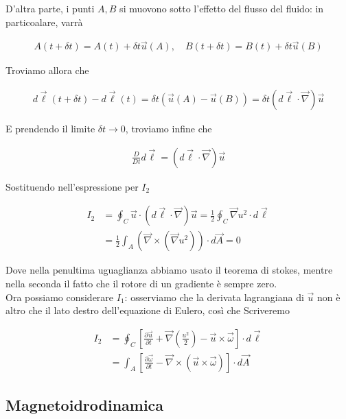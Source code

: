 \documentclass{report}
\begin{document}
D'altra parte, i punti \(A, B\) si muovono sotto l'effetto del flusso del fluido: in particoalare, varrà 

\begin{align}
    A (t+\delta t) = A(t) + \delta t\vec{u}(A), \quad B (t+\delta t) = B(t) + \delta t\vec{u}(B)
\end{align}

Troviamo allora che 

\begin{align}
    d\vec{\ell}(t + \delta t) - d\vec{\ell}(t) = \delta t(\vec{u}(A) - \vec{u}(B)) = \delta t (d\vec{\ell}\cdot \vec{\nabla})\vec{u}
\end{align}

E prendendo il limite \(\delta t \rightarrow 0\), troviamo infine che 

\begin{align}
    \frac{D}{Dt}d\vec{\ell} = (d\vec{\ell}\cdot \vec{\nabla})\vec{u}
\end{align}

Sostituendo nell'espressione per \(I_2\)

\begin{align}
    I_2 &= \oint_C \vec{u}\cdot (d\vec{\ell}\cdot \vec{\nabla})\vec{u} = \frac{1}{2}\oint_C \vec{\nabla}u^2 \cdot d\vec{\ell} \\
    &= \frac{1}{2}\int_A (\vec{\nabla}\times (\vec{\nabla} u^2))\cdot d\vec{A} = 0
\end{align}

Dove nella penultima uguaglianza abbiamo usato il teorema di stokes, mentre nella seconda il fatto che il rotore di un gradiente è sempre zero. \\

Ora possiamo considerare \(I_1\): osserviamo che la derivata lagrangiana di \(\vec{u}\) non è altro che il lato destro dell'equazione di Eulero, così che Scriveremo

\begin{align}
    I_2 &= \oint_C \left[\frac{\partial \vec{u}}{\partial t} + \vec{\nabla}\left(\frac{u^2}{2}\right) - \vec{u}\times \vec{\omega}\right]\cdot d\vec{\ell} \\
    &=  \int_A \left[\frac{\partial \vec{\omega}}{\partial t}- \vec{\nabla}\times (\vec{u}\times \vec{\omega})\right]\cdot d\vec{A}
\end{align}


\subsection{Magnetoidrodinamica}
\end{document}

